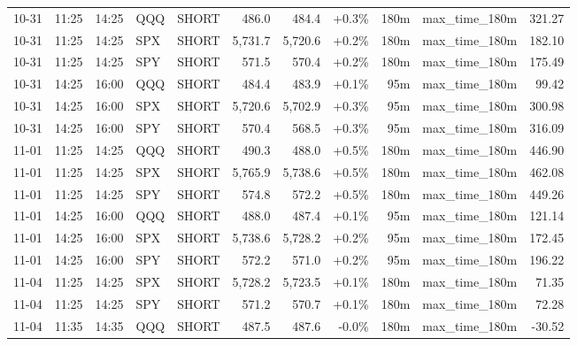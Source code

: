 \documentclass[11pt,a4paper,twoside]{article}
\begin{document}
\begin{center}
\begin{longtable}{>{\color{txtmain}}l l l l l r r r r >{\color{txtmain}}l r}
10-31 & 11:25 & 14:25 & QQQ & SHORT & 486.0 & 484.4 & \textcolor{wingreen}{+0.3\%} & 180m & max\_time\_180m & \textcolor{wingreen}{321.27} \\
10-31 & 11:25 & 14:25 & SPX & SHORT & 5,731.7 & 5,720.6 & \textcolor{wingreen}{+0.2\%} & 180m & max\_time\_180m & \textcolor{wingreen}{182.10} \\
10-31 & 11:25 & 14:25 & SPY & SHORT & 571.5 & 570.4 & \textcolor{wingreen}{+0.2\%} & 180m & max\_time\_180m & \textcolor{wingreen}{175.49} \\
10-31 & 14:25 & 16:00 & QQQ & SHORT & 484.4 & 483.9 & \textcolor{wingreen}{+0.1\%} & 95m & max\_time\_180m & \textcolor{wingreen}{99.42} \\
10-31 & 14:25 & 16:00 & SPX & SHORT & 5,720.6 & 5,702.9 & \textcolor{wingreen}{+0.3\%} & 95m & max\_time\_180m & \textcolor{wingreen}{300.98} \\
10-31 & 14:25 & 16:00 & SPY & SHORT & 570.4 & 568.5 & \textcolor{wingreen}{+0.3\%} & 95m & max\_time\_180m & \textcolor{wingreen}{316.09} \\
11-01 & 11:25 & 14:25 & QQQ & SHORT & 490.3 & 488.0 & \textcolor{wingreen}{+0.5\%} & 180m & max\_time\_180m & \textcolor{wingreen}{446.90} \\
11-01 & 11:25 & 14:25 & SPX & SHORT & 5,765.9 & 5,738.6 & \textcolor{wingreen}{+0.5\%} & 180m & max\_time\_180m & \textcolor{wingreen}{462.08} \\
11-01 & 11:25 & 14:25 & SPY & SHORT & 574.8 & 572.2 & \textcolor{wingreen}{+0.5\%} & 180m & max\_time\_180m & \textcolor{wingreen}{449.26} \\
11-01 & 14:25 & 16:00 & QQQ & SHORT & 488.0 & 487.4 & \textcolor{wingreen}{+0.1\%} & 95m & max\_time\_180m & \textcolor{wingreen}{121.14} \\
11-01 & 14:25 & 16:00 & SPX & SHORT & 5,738.6 & 5,728.2 & \textcolor{wingreen}{+0.2\%} & 95m & max\_time\_180m & \textcolor{wingreen}{172.45} \\
11-01 & 14:25 & 16:00 & SPY & SHORT & 572.2 & 571.0 & \textcolor{wingreen}{+0.2\%} & 95m & max\_time\_180m & \textcolor{wingreen}{196.22} \\
11-04 & 11:25 & 14:25 & SPX & SHORT & 5,728.2 & 5,723.5 & \textcolor{wingreen}{+0.1\%} & 180m & max\_time\_180m & \textcolor{wingreen}{71.35} \\
11-04 & 11:25 & 14:25 & SPY & SHORT & 571.2 & 570.7 & \textcolor{wingreen}{+0.1\%} & 180m & max\_time\_180m & \textcolor{wingreen}{72.28} \\
11-04 & 11:35 & 14:35 & QQQ & SHORT & 487.5 & 487.6 & \textcolor{lossred}{-0.0\%} & 180m & max\_time\_180m & \textcolor{lossred}{-30.52} \\

\end{longtable}
\end{center}
\end{document}
